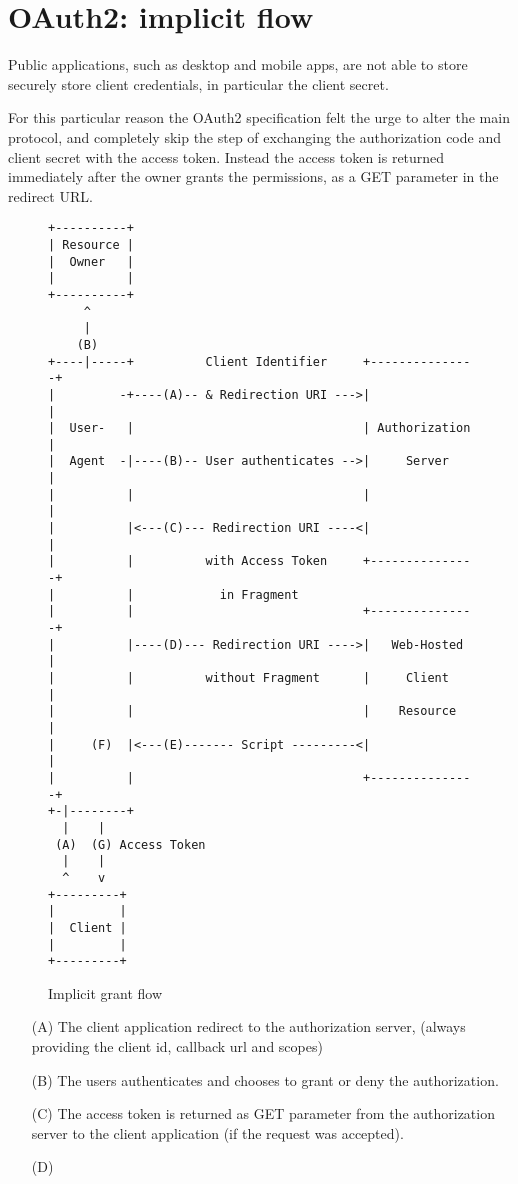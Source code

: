 \section{OAuth2: implicit flow}
\label{sec:implicit}
Public applications, such as desktop and mobile apps, are not able to store
securely store client credentials, in particular the client secret.

For this particular reason the OAuth2 specification felt the urge to alter the
main protocol, and completely skip the step of exchanging the authorization code
and client secret with the access token.
Instead the access token is returned immediately after the owner grants the
permissions, as a GET parameter in the redirect URL.

\begin{figure}[h]
    \centering
    \begin{BVerbatim}
+----------+
| Resource |
|  Owner   |
|          |
+----------+
     ^
     |
    (B)
+----|-----+          Client Identifier     +---------------+
|         -+----(A)-- & Redirection URI --->|               |
|  User-   |                                | Authorization |
|  Agent  -|----(B)-- User authenticates -->|     Server    |
|          |                                |               |
|          |<---(C)--- Redirection URI ----<|               |
|          |          with Access Token     +---------------+
|          |            in Fragment
|          |                                +---------------+
|          |----(D)--- Redirection URI ---->|   Web-Hosted  |
|          |          without Fragment      |     Client    |
|          |                                |    Resource   |
|     (F)  |<---(E)------- Script ---------<|               |
|          |                                +---------------+
+-|--------+
  |    |
 (A)  (G) Access Token
  |    |
  ^    v
+---------+
|         |
|  Client |
|         |
+---------+
\end{BVerbatim}
    \caption{Implicit grant flow \cite{ietf-oauth}}
    \label{fig:authorization-implicit-grant-flow}
\end{figure}

\begin{enumerate}
    \item[(A)]
        The client application redirect to the authorization server, (always
        providing the client id, callback url and scopes)
    \item[(B)]
        The users authenticates and chooses to grant or deny the
        authorization.
    \item[(C)]
        The access token is returned as GET parameter from the authorization
        server to the client application (if the request was accepted).

    \item[(D)]
\end{enumerate}


